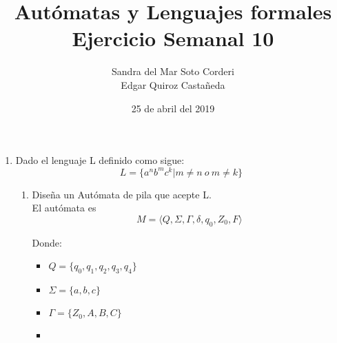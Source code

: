 \documentclass{article}
\begin{document}
    \title{
        Autómatas y Lenguajes formales \\
        Ejercicio Semanal 10
    }

    \author{
        Sandra del Mar Soto Corderi \\
        Edgar Quiroz Castañeda
    }

    \date{
        25 de abril del 2019
    }
    
    \maketitle

    \begin{enumerate}
        \item {
        Dado el lenguaje L definido como sigue:\\
        \begin{equation*}
        	L = \{a^nb^mc^k | m \neq n \ o \   m \neq k \}
        \end{equation*}
        
        
        \begin{enumerate}
        	\item {
        	Diseña un Autómata de pila que acepte L.\\
         El autómata es \[M = \langle Q , \Sigma, \Gamma , \delta, q_0 , Z_0,  F\rangle\]
         
         Donde:
         
         \begin{itemize}
         	\item {
         		$Q = \{q_0, q_1, q_2, q_3, q_4\}$
         	}
         	\item {
         		$\Sigma = \{a, b,c\}$
         	}
         	\item {
         		$\Gamma = \{Z_0, A, B, C\}$\\
         	}
         	
         	
         	\item {
         	        		
}
\end{itemize}}
\end{enumerate}}
\end{enumerate}
\end{document}
